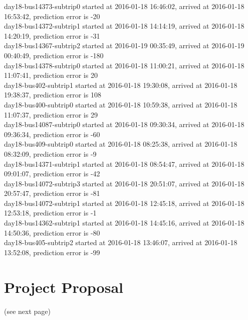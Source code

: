 \documentclass[12pt,a4paper,oneside,openright]{report}
\begin{document}
{day18-bus14373-subtrip0 started at 2016-01-18 16:46:02, arrived at 2016-01-18 16:53:42, prediction error is -20 \\
day18-bus14372-subtrip1 started at 2016-01-18 14:14:19, arrived at 2016-01-18 14:20:19, prediction error is -31 \\
day18-bus14367-subtrip2 started at 2016-01-19 00:35:49, arrived at 2016-01-19 00:40:49, prediction error is -180 \\
day18-bus14378-subtrip0 started at 2016-01-18 11:00:21, arrived at 2016-01-18 11:07:41, prediction error is 20 \\
day18-bus402-subtrip1 started at 2016-01-18 19:30:08,    arrived at 2016-01-18 19:38:37, prediction error is 108 \\
day18-bus400-subtrip0 started at 2016-01-18 10:59:38,    arrived at 2016-01-18 11:07:37, prediction error is 29 \\
day18-bus14087-subtrip0 started at 2016-01-18 09:30:34, arrived at 2016-01-18 09:36:34, prediction error is -60 \\
day18-bus409-subtrip0 started at 2016-01-18 08:25:38,    arrived at 2016-01-18 08:32:09, prediction error is -9 \\
day18-bus14371-subtrip1 started at 2016-01-18 08:54:47, arrived at 2016-01-18 09:01:07, prediction error is -42 \\
day18-bus14072-subtrip3 started at 2016-01-18 20:51:07, arrived at 2016-01-18 20:57:47, prediction error is -81 \\
day18-bus14072-subtrip1 started at 2016-01-18 12:45:18, arrived at 2016-01-18 12:53:18, prediction error is -1 \\
day18-bus14362-subtrip1 started at 2016-01-18 14:45:16, arrived at 2016-01-18 14:50:36, prediction error is -80 \\
day18-bus405-subtrip2 started at 2016-01-18 13:46:07,    arrived at 2016-01-18 13:52:08, prediction error is -99 \\
}


\chapter{Project Proposal}
(see next page)


\end{document}
